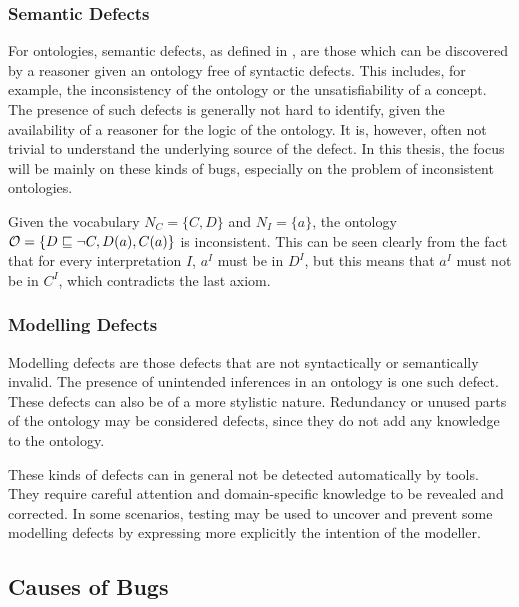 \subsubsection{Semantic Defects} \label{semantic-defects}

For ontologies, semantic defects, as defined in \cite{kalyanpur2005debugging}, are those which can be discovered by a reasoner given an ontology free of syntactic defects. This includes, for example, the inconsistency of the ontology or the unsatisfiability of a concept. The presence of such defects is generally not hard to identify, given the availability of a reasoner for the logic of the ontology. It is, however, often not trivial to understand the underlying source of the defect. In this thesis, the focus will be mainly on these kinds of bugs, especially on the problem of inconsistent ontologies.

\begin{example}
  Given the vocabulary $N_C = \{ C, D \}$ and $N_I = \{ a \}$, the \SROIQ ontology $\mathcal{O} = \{ D \sqsubseteq \lnot C, D(a), C(a) \}$ is inconsistent. This can be seen clearly from the fact that for every interpretation $I$, $a^I$ must be in $D^I$, but this means that $a^I$ must not be in $C^I$, which contradicts the last axiom.
\end{example}

\subsubsection{Modelling Defects} \label{modelling-defects}

Modelling defects are those defects that are not syntactically or semantically invalid. The presence of unintended inferences in an ontology is one such defect. These defects can also be of a more stylistic nature. Redundancy or unused parts of the ontology may be considered defects, since they do not add any knowledge to the ontology.

These kinds of defects can in general not be detected automatically by tools. They require careful attention and domain-specific knowledge to be revealed and corrected. In some scenarios, testing may be used to uncover and prevent some modelling defects by expressing more explicitly the intention of the modeller.

\subsection{Causes of Bugs} \label{causes-of-bugs}

